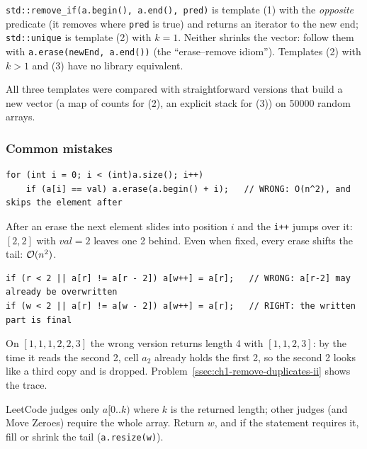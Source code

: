 \begin{insightbox}
\texttt{std::remove\_if(a.begin(), a.end(), pred)} is template (1) with the \emph{opposite} predicate (it removes where \texttt{pred} is true) and returns an iterator to the new end; \texttt{std::unique} is template (2) with $k = 1$. Neither shrinks the vector: follow them with \texttt{a.erase(newEnd, a.end())} (the ``erase--remove idiom''). Templates (2) with $k > 1$ and (3) have no library equivalent.
\end{insightbox}

All three templates were compared with straightforward versions that build a new vector (a map of counts for (2), an explicit stack for (3)) on 50000 random arrays.

\subsubsection*{Common mistakes}

\begin{warningbox}
\begin{lstlisting}[style=snippet]
for (int i = 0; i < (int)a.size(); i++)
    if (a[i] == val) a.erase(a.begin() + i);   // WRONG: O(n^2), and skips the element after
\end{lstlisting}
After an erase the next element slides into position $i$ and the \texttt{i++} jumps over it: $[2, 2]$ with $\mathit{val} = 2$ leaves one 2 behind. Even when fixed, every erase shifts the tail: $\mathcal{O}(n^2)$.
\end{warningbox}

\begin{warningbox}
\begin{lstlisting}[style=snippet]
if (r < 2 || a[r] != a[r - 2]) a[w++] = a[r];   // WRONG: a[r-2] may already be overwritten
if (w < 2 || a[r] != a[w - 2]) a[w++] = a[r];   // RIGHT: the written part is final
\end{lstlisting}
On $[1,1,1,2,2,3]$ the wrong version returns length 4 with $[1,1,2,3]$: by the time it reads the second 2, cell $a_2$ already holds the first 2, so the second 2 looks like a third copy and is dropped. Problem~\ref{ssec:ch1-remove-duplicates-ii} shows the trace.
\end{warningbox}

\begin{warningbox}
LeetCode judges only $a[0..k)$ where $k$ is the returned length; other judges (and Move Zeroes) require the whole array. Return $w$, and if the statement requires it, fill or shrink the tail (\texttt{a.resize(w)}).
\end{warningbox}

